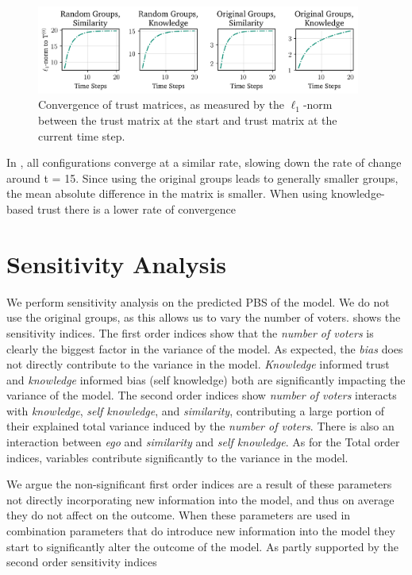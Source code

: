 \documentclass[11pt, oneside, dvipsnames]{Thesis} %
\begin{document}
\begin{figure}[ht]
	\begin{center}
		\includegraphics[width=0.95\textwidth]{Figures/convergence_groups.png}
	\end{center}
	\caption{Convergence of trust matrices, as measured by the $\ell_1$-norm between the trust matrix at the start and  trust matrix at the current time step.}\label{fig:convergence_big}
\end{figure}

In , all configurations converge at a
similar rate, slowing down the rate of change around t = 15. Since using the
original groups leads to generally smaller groups, the mean absolute difference in
the matrix is smaller. When using knowledge-based trust there is a lower rate
of convergence




\section{Sensitivity Analysis} We perform sensitivity analysis on the predicted
PBS of the model. We do not use the original groups, as this allows us to vary
the number of voters.  shows the sensitivity indices.
The first order indices show that the \textit{number
	of voters} is clearly the biggest factor in the variance of the model. As
expected, the \textit{bias} does not directly contribute to the variance in the
model. \textit{Knowledge} informed trust and\textit{ knowledge} informed bias
(self knowledge) both are significantly impacting the variance of the model.
The second order indices show \textit{number of voters} interacts with
\textit{knowledge}, \textit{self knowledge}, and\textit{ similarity},
contributing a large portion of their explained total variance induced by the
\textit{number of voters}. There is also an interaction between \textit{ego}
and \textit{similarity} and \textit{self knowledge}. As for the Total order
indices, variables contribute significantly to the variance in the
model.

We argue the non-significant first order indices are a result of these
parameters not directly incorporating new information into the model, and thus
on average they do not affect on the outcome. When these parameters are used in
combination parameters that do introduce new information into the model they
start to significantly alter the outcome of the model. As partly supported by
the second order sensitivity indices
\end{document}
